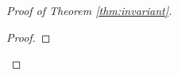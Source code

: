 \documentclass[twocolumn]{article}[10pt]
\begin{document}
\begin{proof}[Proof of Theorem \ref{thm:invariant}]
\begin{proof}





\end{proof}
\end{proof}
\end{document}
